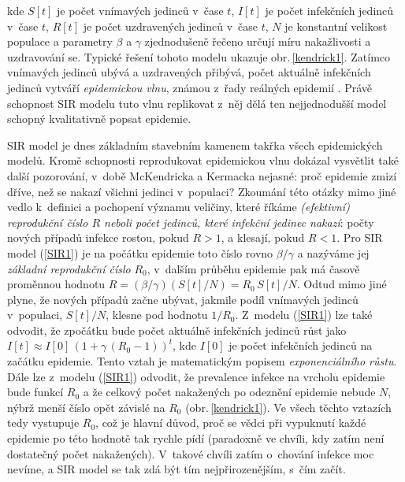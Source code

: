 kde $S[t]$ je počet vnímavých jedinců v~čase $t$, $I[t]$ je počet infekčních jedinců v~čase $t$, $R[t]$ je počet uzdravených jedinců v~čase $t$, $N$ je konstantní velikost populace a parametry $\beta$ a $\gamma$ zjednodušeně řečeno určují míru nakažlivosti a uzdravování se. Typické řešení tohoto modelu ukazuje obr.\,\ref{kendrick1}. Zatímco vnímavých jedinců ubývá a uzdravených přibývá, počet aktuálně infekčních jedinců vytváří \emph{epidemickou vlnu}, známou z~řady reálných epidemií \cite{Bell_etal2016,Finger_etal2019}. Právě schopnost SIR modelu tuto vlnu replikovat z~něj dělá ten nejjednodušší model schopný kvalitativně popsat epidemie.  

SIR model je dnes základním stavebním kamenem takřka všech epidemických modelů. Kromě schopnosti reprodukovat epidemickou vlnu dokázal vysvětlit také další pozorování, v~době McKendricka a Kermacka nejasné: proč epidemie zmizí dříve, než se nakazí všichni jedinci v~populaci? Zkoumání této otázky mimo jiné vedlo k~definici a pochopení významu veličiny, které říkáme \emph{(efektivní) reprodukční číslo $R$ neboli počet jedinců, které infekční jedinec nakazí}: počty nových případů infekce rostou, pokud $R>1$, a klesají, pokud $R<1$. Pro SIR model (\ref{SIR1}) je na počátku epidemie toto číslo rovno $\beta/\gamma$ a nazýváme jej \emph{základní reprodukční číslo} $R_0$, v~dalším průběhu epidemie pak má časově proměnnou hodnotu $R = (\beta/\gamma)(S[t]/N) = R_0 \,S[t] / N$. Odtud mimo jiné plyne, že nových případů začne ubývat, jakmile podíl vnímavých jedinců v~populaci, $S[t]/N$, klesne pod hodnotu $1/R_0$. Z~modelu (\ref{SIR1}) lze také odvodit, že zpočátku bude počet aktuálně infekčních jedinců růst jako $I[t] \approx I[0]\,(1+\gamma\,(R_0-1))^t$, kde $I[0]$ je počet infekčních jedinců na začátku epidemie. Tento vztah je matematickým popisem \emph{exponenciálního růstu}. Dále lze z~modelu (\ref{SIR1}) odvodit, že prevalence infekce na vrcholu epidemie bude funkcí $R_0$ a že celkový počet nakažených po odeznění epidemie nebude $N$, nýbrž menší číslo opět závislé na $R_0$ (obr.\,\ref{kendrick1}). Ve všech těchto vztazích tedy vystupuje $R_0$, což je hlavní důvod, proč se vědci při vypuknutí každé epidemie po této hodnotě tak rychle pídí (paradoxně ve chvíli, kdy zatím není dostatečný počet nakažených). V~takové chvíli zatím o~chování infekce moc nevíme, a SIR model se tak zdá být tím nejpřirozenějším, s~čím začít. 

